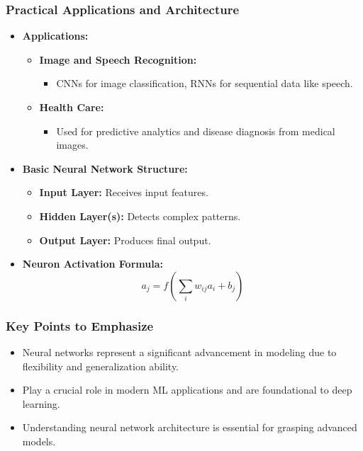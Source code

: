 \documentclass[aspectratio=169]{beamer}
\begin{document}
\begin{frame}[fragile]
    \frametitle{Practical Applications and Architecture}
    \begin{itemize}
        \item \textbf{Applications:}
        \begin{itemize}
            \item \textbf{Image and Speech Recognition:} 
            \begin{itemize}
                \item CNNs for image classification, RNNs for sequential data like speech.
            \end{itemize}
            \item \textbf{Health Care:} 
            \begin{itemize}
                \item Used for predictive analytics and disease diagnosis from medical images.
            \end{itemize}
        \end{itemize}
        
        \item \textbf{Basic Neural Network Structure:}
        \begin{itemize}
            \item \textbf{Input Layer:} Receives input features.
            \item \textbf{Hidden Layer(s):} Detects complex patterns.
            \item \textbf{Output Layer:} Produces final output.
        \end{itemize}
        
        \item \textbf{Neuron Activation Formula:}
        \begin{equation}
            a_j = f\left(\sum_{i} w_{ij} a_i + b_j\right)
        \end{equation}
    \end{itemize}
\end{frame}

\begin{frame}[fragile]
    \frametitle{Key Points to Emphasize}
    \begin{itemize}
        \item Neural networks represent a significant advancement in modeling due to flexibility and generalization ability.
        \item Play a crucial role in modern ML applications and are foundational to deep learning.
        \item Understanding neural network architecture is essential for grasping advanced models.
    \end{itemize}
\end{frame}
\end{document}
